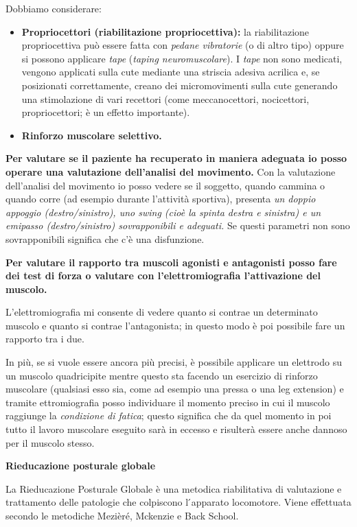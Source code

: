 \documentclass[]{article}
\begin{document}
Dobbiamo considerare:

\begin{itemize}
\item
  \textbf{Propriocettori (riabilitazione propriocettiva):} la
  riabilitazione propriocettiva può essere fatta con \emph{pedane
  vibratorie} (o di altro tipo) oppure si possono applicare \emph{tape}
  (\emph{taping neuromuscolare}). I \emph{tape} non sono medicati,
  vengono applicati sulla cute mediante una striscia adesiva acrilica e,
  se posizionati correttamente, creano dei micromovimenti sulla cute
  generando una stimolazione di vari recettori (come meccanocettori,
  nocicettori, propriocettori; è un effetto importante).
\item
  \textbf{Rinforzo muscolare selettivo.}
\end{itemize}

\textbf{Per valutare se il paziente ha recuperato in maniera adeguata io
posso operare una valutazione dell'analisi del movimento.} Con la
valutazione dell'analisi del movimento io posso vedere se il soggetto,
quando cammina o quando corre (ad esempio durante l'attività sportiva),
presenta \emph{un doppio appoggio (destro/sinistro), uno swing (cioè la
spinta destra e sinistra) e un emipasso (destro/sinistro) sovrapponibili
e adeguati.} Se questi parametri non sono sovrapponibili significa che
c'è una disfunzione.

\textbf{Per valutare il rapporto tra muscoli agonisti e antagonisti
posso fare dei test di forza o valutare con l'elettromiografia
l'attivazione del muscolo. }

L'elettromiografia mi consente di vedere quanto si contrae un
determinato muscolo e quanto si contrae l'antagonista; in questo modo è
poi possibile fare un rapporto tra i due.

In più, se si vuole essere ancora più precisi, è possibile applicare un
elettrodo su un muscolo quadricipite mentre questo sta facendo un
esercizio di rinforzo muscolare (qualsiasi esso sia, come ad esempio una
pressa o una leg extension) e tramite ettromiografia posso individuare
il momento preciso in cui il muscolo raggiunge la \emph{condizione di
fatica}; questo significa che da quel momento in poi tutto il lavoro
muscolare eseguito sarà in eccesso e risulterà essere anche dannoso per
il muscolo stesso.

\textbf{Rieducazione posturale globale}

La Rieducazione Posturale Globale è una metodica riabilitativa di
valutazione e trattamento delle patologie che colpiscono l ́apparato
locomotore. Viene effettuata secondo le metodiche Mezièré, Mckenzie e
Back School.
\end{document}
